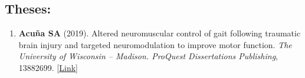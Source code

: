 \documentclass[letterpaper, 10pt]{article}
\begin{document}
\begin{enumerate}
\end{enumerate}



\subsection{Theses:}
\begin{enumerate}
    \item \textbf{Acuña SA} (2019). Altered neuromuscular control of gait following traumatic brain injury and targeted neuromodulation to improve motor function. \textit{The University of Wisconsin -- Madison. ProQuest Dissertations Publishing}, 13882699. [\href{https://www.proquest.com/docview/2229834647}{Link}]
\end{enumerate}

\end{document}
